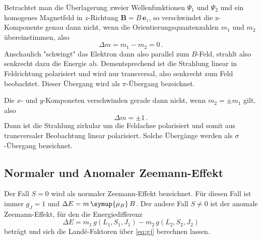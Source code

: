 Betrachtet man die Überlagerung zweier Wellenfunktionen $\Psi_1$ und
$\Psi_2$ und ein homogenes Magnetfeld in $z$-Richtung $\symbf{B}=B\,\symbf{e}_z$,
so verschwindet die z-Komponente genau dann nicht, wenn die Orientierungsquantenzahlen
$m_1$ und $m_2$ übereinstimmen, also
\begin{equation}
\Delta m = m_1 - m_2 = 0 \, .
\end{equation}
Anschaulich "schwingt" das Elektron dann also parallel zum $B$-Feld,
strahlt also senkrecht dazu die Energie ab. Dementsprechend ist die
Strahlung linear in Feldrichtung polarisiert und wird nur transversal,
also senkrecht zum Feld beobachtet. Dieser Übergang wird als $\pi$-Übergang
bezeichnet.

Die $x$- und $y$-Komponeten verschwinden gerade dann nicht,
wenn $m_2=\pm m_1$ gilt, also
\begin{equation}
\Delta m = \pm 1 \, .
\end{equation}
Dann ist die Strahlung zirkular um die Feldachse polarisiert und somit
aus transversaler Beobachtung linear polarisiert. Solche Übergänge werden
als $\sigma$-Übergang bezeichnet.

\subsection{Normaler und Anomaler Zeemann-Effekt}
Der Fall $S=0$ wird als normaler Zeemann-Effekt bezeichnet. Für diesen Fall ist immer
$g_J = 1$ und $\Delta E = m \, \symup{\mu_B} \, B$.
Der andere Fall $S \neq 0$ ist der anomale Zeemann-Effekt, für den die
Energiedifferenz
\begin{equation}
\label{eq:dE}
\Delta E = m_1 \, g(L_1,S_1,J_1) - m_2 \, g(L_2,S_2,J_2)
\end{equation}
beträgt und sich die Landé-Faktoren über \ref{eq:gj} berechnen lassen.
